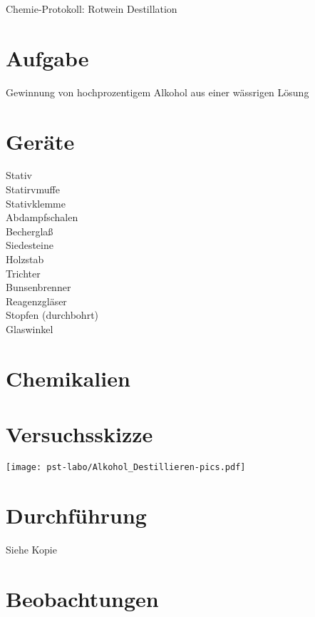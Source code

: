 \documentclass[12pt,a4paper,ngerman,numbers=noenddot,toc=listof]{scrartcl}	%
\begin{document}
\setcounter{headpages}{0}
{

  \centering \huge{Chemie-Protokoll: Rotwein Destillation}

}
\section*{Aufgabe}
Gewinnung von hochprozentigem Alkohol aus einer wässrigen Lösung

\begin{multicols}{2}
\section*{Geräte}
Stativ\\
Statirvmuffe\\
Stativklemme\\
Abdampfschalen\\
Becherglaß\\
Siedesteine\\
Holzstab\\
Trichter\\
Bunsenbrenner\\
Reagenzgläser\\
Stopfen (durchbohrt)\\
Glaswinkel

\columnbreak
\section*{Chemikalien}

\vspace{-3.7cm}
\end{multicols}

\section*{Versuchsskizze}
\vspace{-2.02cm}
\begin{center}
\texttt{[image: pst-labo/Alkohol\_Destillieren-pics.pdf]}
\end{center}

\section*{Durchführung}
Siehe Kopie

\section*{Beobachtungen}
\end{document}
